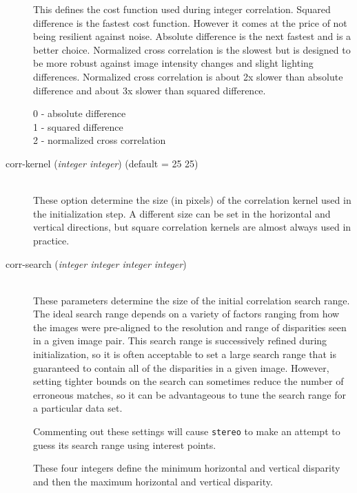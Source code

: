 \begin{description}
  This defines the cost function used during integer
  correlation. Squared difference is the fastest cost
  function. However it comes at the price of not being resilient
  against noise. Absolute difference is the next fastest and is a
  better choice. Normalized cross correlation is the slowest but is
  designed to be more robust against image intensity changes and
  slight lighting differences. Normalized cross correlation is about
  2x slower than absolute difference and about 3x slower than squared
  difference.

  \begin{description}
    \item[0 - absolute difference]
    \item[1 - squared difference]
    \item[2 - normalized cross correlation]
  \end{description}

\item[corr-kernel \textnormal{\small{(\emph{integer integer})}} (default = 25 25)] \hfill \\
  These option determine the size (in pixels) of the correlation
  kernel used in the initialization step.  A different size can be set
  in the horizontal and vertical directions, but square correlation
  kernels are almost always used in practice.

\item[corr-search \textnormal{\small{(\emph{integer integer integer integer})}}] \hfill \\
  These parameters determine the size of the initial correlation
  search range.  The ideal search range depends on a variety of
  factors ranging from how the images were pre-aligned to the
  resolution and range of disparities seen in a given image pair.
  This search range is successively refined during initialization, so
  it is often acceptable to set a large search range that is guaranteed
  to contain all of the disparities in a given image.  However,
  setting tighter bounds on the search can sometimes reduce the number
  of erroneous matches, so it can be advantageous to tune the
  search range for a particular data set.

  Commenting out these settings will cause \texttt{stereo} to make an
  attempt to guess its search range using interest points.

  These four integers define the minimum horizontal and
  vertical disparity and then the maximum horizontal and vertical
  disparity.


\end{description}
